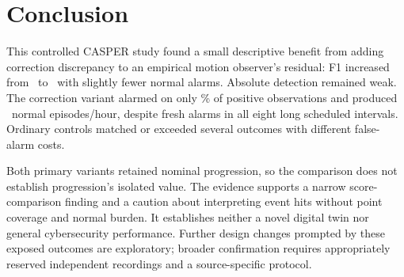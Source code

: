 \section{Conclusion}
This controlled CASPER study found a small descriptive benefit from adding correction discrepancy to an empirical motion observer's residual: F1 increased from \RFone\ to \RCFone\ with slightly fewer normal alarms. Absolute detection remained weak. The correction variant alarmed on only \RCRecallPct\% of positive observations and produced \RCEpisodeRate\ normal episodes/hour, despite fresh alarms in all eight long scheduled intervals. Ordinary controls matched or exceeded several outcomes with different false-alarm costs.

Both primary variants retained nominal progression, so the comparison does not establish progression's isolated value. The evidence supports a narrow score-comparison finding and a caution about interpreting event hits without point coverage and normal burden. It establishes neither a novel digital twin nor general cybersecurity performance. Further design changes prompted by these exposed outcomes are exploratory; broader confirmation requires appropriately reserved independent recordings and a source-specific protocol.
